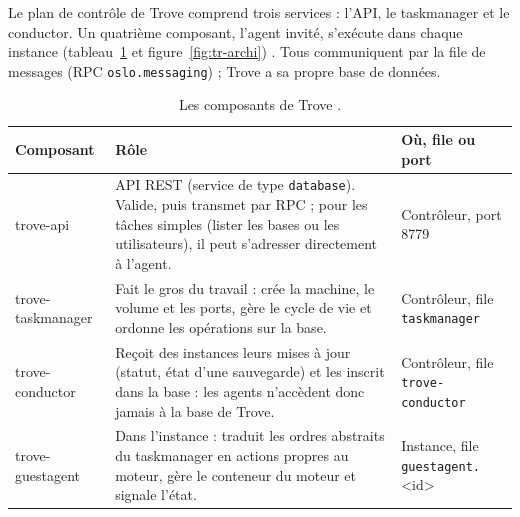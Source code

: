 Le plan de contrôle de Trove comprend trois services : l'API, le taskmanager et le conductor. Un quatrième composant, l'agent invité,
s'exécute dans chaque instance (tableau~\ref{tab:tr-composants} et figure~\ref{fig:tr-archi}) \parencite{trove-design,trove-overview}.
Tous communiquent par la file de messages (RPC \texttt{oslo.messaging}) ; Trove a sa propre base de données.

\begin{table}[!ht]
\centering
\renewcommand{\arraystretch}{1.3}
\begin{tabular}{@{}>{\raggedright\arraybackslash\ttfamily\small}p{3.3cm}>{\raggedright\arraybackslash}p{8.4cm}>{\raggedright\arraybackslash}p{3.8cm}@{}}
\toprule
\textrm{\textbf{Composant}} & \textbf{Rôle} & \textbf{Où, file ou port} \\
\midrule
trove-api & API REST (service de type \texttt{database}). Valide, puis transmet par RPC ; pour les tâches simples (lister les bases ou les utilisateurs), il peut s'adresser directement à l'agent. & Contrôleur, port 8779 \\
trove-taskmanager & Fait le gros du travail : crée la machine, le volume et les ports, gère le cycle de vie et ordonne les opérations sur la base. & Contrôleur, file \texttt{taskmanager} \\
trove-conductor & Reçoit des instances leurs mises à jour (statut, état d'une sauvegarde) et les inscrit dans la base : les agents n'accèdent donc jamais à la base de Trove. & Contrôleur, file \texttt{trove-conductor} \\
trove-guestagent & Dans l'instance : traduit les ordres abstraits du taskmanager en actions propres au moteur, gère le conteneur du moteur et signale l'état. & Instance, file \texttt{guestagent.}{\textless}id{\textgreater} \\
\bottomrule
\end{tabular}
\caption{Les composants de Trove \parencite{trove-design,trove-production}.}
\label{tab:tr-composants}
\end{table}

